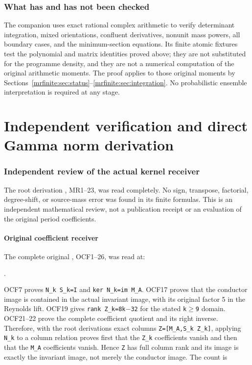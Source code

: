 \section{What has and has not been checked}\label{mrfinite:sec:checks}

The companion  uses exact rational complex
arithmetic to verify determinant integration, mixed orientations,
confluent derivatives, nonunit mass powers, all boundary cases, and the
minimum-section equations. Its finite atomic fixtures test the
polynomial and matrix identities proved above; they are not substituted
for the programme density, and they are not a numerical computation of
the original arithmetic moments. The proof applies to those original
moments by Sections~\ref{mrfinite:sec:status}--\ref{mrfinite:sec:integration}.
No probabilistic ensemble interpretation is required at any stage.

\endgroup

\clearpage\begingroup
\part*{Independent verification and direct Gamma norm derivation}
\providecommand{\mrreviewtightlist}{\setlength{\itemsep}{0pt}\setlength{\parskip}{0pt}}

\section{Independent review of the actual kernel receiver}\label{mrreview:independent-review-of-the-actual-kernel-receiver}

The root derivation , MR1--23, was read completely. No sign, transpose, factorial, degree-shift, or source-mass error was found in its finite formulas. This is an independent mathematical review, not a publication receipt or an evaluation of the original period coefficients.

\subsection{Original coefficient receiver}\label{mrreview:original-coefficient-receiver}

The complete original , OCF1--26, was read at:

.

OCF7 proves \texttt{N\_k\ S\_k=I} and \texttt{ker\ N\_k=im\ M\_A}. OCF17 proves that the conductor image is contained in the actual invariant image, with its original factor 5 in the Reynolds lift. OCF19 gives \texttt{rank\ Z\_k=8k\ensuremath{-}32} for the stated \texttt{k\ensuremath{\ge}9} domain. OCF21--22 prove the complete coefficient quotient and its right inverse. Therefore, with the root derivation\textquotesingle s exact columns \texttt{Z={[}M\_A,S\_k\ Z\_k{]}}, applying \texttt{N\_k} to a column relation proves first that the \texttt{Z\_k} coefficients vanish and then that the \texttt{M\_A} coefficients vanish. Hence \texttt{Z} has full column rank and its image is exactly the invariant image, not merely the conductor image. The count is

